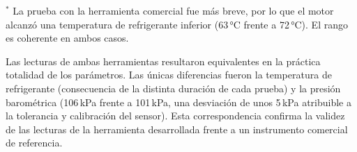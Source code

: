 \begin{table}[!htbp]
\caption{Comparación de la telemetría del Škoda Yeti: herramienta desarrollada (base de datos SQLite) frente a la herramienta comercial de referencia.}
\label{tab:skoda_telemetria}
\centering
\renewcommand{\arraystretch}{1.2}

\vspace{2pt}
{\footnotesize $^{*}$ La prueba con la herramienta comercial fue más breve, por lo que el motor alcanzó una temperatura de refrigerante inferior (63\,°C frente a 72\,°C). El rango es coherente en ambos casos.}
\end{table}

Las lecturas de ambas herramientas resultaron equivalentes en la práctica totalidad de los parámetros. Las únicas diferencias fueron la temperatura de refrigerante (consecuencia de la distinta duración de cada prueba) y la presión barométrica (106\,kPa frente a 101\,kPa, una desviación de unos 5\,kPa atribuible a la tolerancia y calibración del sensor). Esta correspondencia confirma la validez de las lecturas de la herramienta desarrollada frente a un instrumento comercial de referencia.

